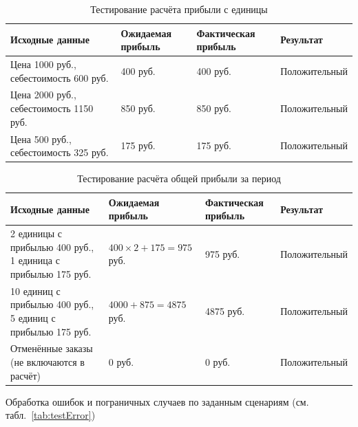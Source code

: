 \begin{table}[htb]
\caption{\label{tab:testPerUnit}Тестирование расчёта прибыли с единицы}
\small
\begin{center}
\vspace{-0.5cm}\begin{tabular}{|p{7cm}|p{2.5cm}|p{2.5cm}|p{3cm}|}
\hline
Исходные данные & Ожидаемая прибыль & Фактическая прибыль & Результат \\ \hline
Цена 1000 руб., себестоимость 600 руб. & 400 руб. & 400 руб. & Положительный \\ \hline
Цена 2000 руб., себестоимость 1150 руб. & 850 руб. & 850 руб. & Положительный \\ \hline
Цена 500 руб., себестоимость 325 руб. & 175 руб. & 175 руб. & Положительный \\ \hline
\end{tabular}
\end{center}
\end{table}

\begin{table}[htb]
\caption{\label{tab:testCalProf}Тестирование расчёта общей прибыли за период}
\small
\begin{center}
\vspace{-0.5cm}\begin{tabular}{|p{7cm}|p{2.5cm}|p{2.5cm}|p{3cm}|}
\hline
Исходные данные & Ожидаемая прибыль & Фактическая прибыль & Результат \\ \hline
2 единицы с прибылью 400 руб., 1 единица с прибылью 175 руб. & $400 \times 2 + 175 = 975$ руб. & 975 руб. & Положительный \\ \hline
10 единиц с прибылью 400 руб., 5 единиц с прибылью 175 руб. & $4000 + 875 = 4875$ руб. & 4875 руб. & Положительный \\ \hline
Отменённые заказы (не включаются в расчёт) & 0 руб. & 0 руб. & Положительный \\ \hline
\end{tabular}
\end{center}
\end{table}

Обработка ошибок и пограничных случаев по заданным сценариям (см. табл.~\ref{tab:testError})

